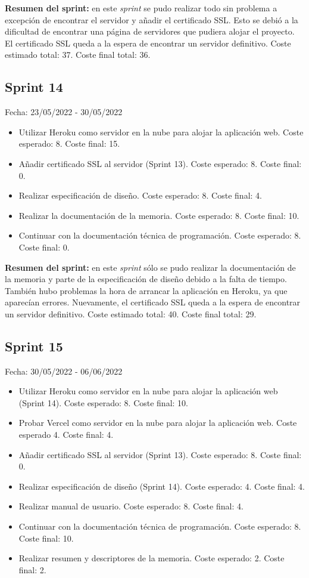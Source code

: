 \textbf{Resumen del sprint:} en este \textit{sprint} se pudo realizar todo sin problema a excepción de encontrar el servidor y añadir el certificado SSL. Esto se debió a la dificultad de encontrar una página de servidores que pudiera alojar el proyecto. El certificado SSL queda a la espera de encontrar un servidor definitivo. Coste estimado total: 37. Coste final total: 36.

\subsection{Sprint 14}
Fecha: 23/05/2022 - 30/05/2022
\begin{itemize}
	\item Utilizar Heroku como servidor en la nube para alojar la aplicación web. Coste esperado: 8. Coste final: 15.
	\item Añadir certificado SSL al servidor (Sprint 13). Coste esperado: 8. Coste final: 0.
	\item Realizar especificación de diseño. Coste esperado: 8. Coste final: 4.
	\item Realizar la documentación de la memoria. Coste esperado: 8. Coste final: 10.
	\item Continuar con la documentación técnica de programación. Coste esperado: 8. Coste final: 0.
\end{itemize}

\textbf{Resumen del sprint:} en este \textit{sprint} sólo se pudo realizar la documentación de la memoria y parte de la especificación de diseño debido a la falta de tiempo. También hubo problemas la hora de arrancar la aplicación en Heroku, ya que aparecían errores. Nuevamente, el certificado SSL queda a la espera de encontrar un servidor definitivo. Coste estimado total: 40. Coste final total: 29.

\subsection{Sprint 15}
Fecha: 30/05/2022 - 06/06/2022
\begin{itemize}
	\item Utilizar Heroku como servidor en la nube para alojar la aplicación web (Sprint 14). Coste esperado: 8. Coste final: 10.
	\item Probar Vercel como servidor en la nube para alojar la aplicación web. Coste esperado 4. Coste final: 4.
	\item Añadir certificado SSL al servidor (Sprint 13). Coste esperado: 8. Coste final: 0.
	\item Realizar especificación de diseño (Sprint 14). Coste esperado: 4. Coste final: 4.
	\item Realizar manual de usuario. Coste esperado: 8. Coste final: 4.
	\item Continuar con la documentación técnica de programación. Coste esperado: 8. Coste final: 10.
	\item Realizar resumen y descriptores de la memoria. Coste esperado: 2. Coste final: 2.
\end{itemize}

